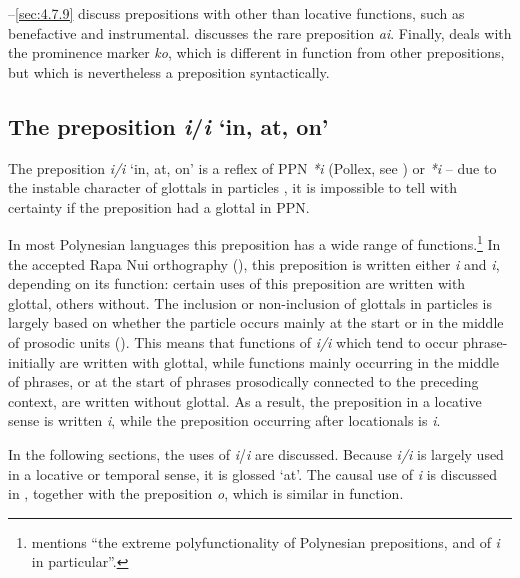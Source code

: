 –\ref{sec:4.7.9} discuss prepositions with other than locative functions, such as benefactive and instrumental.  discusses the rare preposition \textit{{\ꞌ}ai}. Finally,  deals with the prominence marker \textit{ko}, which is different in function from other prepositions, but which is nevertheless a preposition syntactically.

\subsection{The preposition \textit{{\ꞌ}i}/\textit{i} ‘in, at, on’}\label{sec:4.7.2}

The preposition \textit{{\ꞌ}i/i} ‘in, at, on’ is a reflex of PPN \textit{*{\ꞌ}i} (Pollex, see \citealt{GreenhillClark2011}) or \textit{*i} \citep[41]{Clark1976} – due to the instable character of glottals in particles \citep[22]{Clark1976}, it is impossible to tell with certainty if the preposition had a glottal in PPN. 

In most Polynesian languages this preposition has a wide range of functions.\footnote{\label{fn:229}\citet[428]{Chapin1978} mentions “the extreme polyfunctionality of Polynesian prepositions, and of \textit{i} in particular”.} In the accepted Rapa Nui orthography (), this preposition is written either \textit{{\ꞌ}i} and \textit{i}, depending on its function: certain uses of this preposition are written with glottal, others without. The inclusion or non-inclusion of glottals in particles is largely based on whether the particle occurs mainly at the start or in the middle of prosodic units (). This means that functions of \textit{i/{\ꞌ}i} which tend to occur phrase-initially are written with glottal, while functions mainly occurring in the middle of phrases, or at the start of phrases prosodically connected to the preceding context, are written without glottal. As a result, the preposition in a locative sense is written \textit{{\ꞌ}i}, while the preposition occurring after locationals is \textit{i}.

In the following sections, the uses of \textit{i}/\textit{{\ꞌ}i} are discussed.  Because \textit{{\ꞌ}i/i} is largely used in a locative or temporal sense, it is glossed ‘at’.
The causal use of \textit{{\ꞌ}i} is discussed in , together with the preposition \textit{{\ꞌ}o}, which is similar in function.

